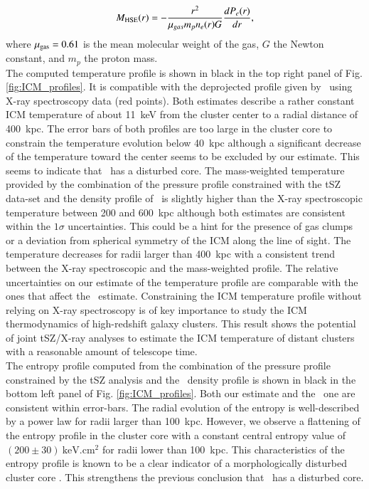 \documentclass[traditabstract]{aa}
\begin{document}
\begin{equation}
M_{\rm HSE}(r) = -\frac{r^2}{\mu_{gas} m_p n_e(r) G} \frac{dP_e(r)}{dr},
\label{eq:hse_mass}
\end{equation}
where $\mu_{\rm{gas}} = 0.61$ is the mean molecular weight of the gas, $G$ the Newton constant, and $m_p$ the proton mass.\\
\indent The computed temperature profile is shown in black in the top right panel of Fig. \ref{fig:ICM_profiles}. It is compatible with the deprojected profile given by \xmm\ using X-ray spectroscopy data (red points). Both estimates describe a rather constant ICM temperature of about 11~keV from the cluster center to a radial distance of 400~kpc. The error bars of both profiles are too large in the cluster core to constrain the temperature evolution below 40~kpc although a significant decrease of the temperature toward the center seems to be excluded by our estimate. This seems to indicate that \psz\ has a disturbed core. The mass-weighted temperature provided by the combination of the pressure profile constrained with the tSZ data-set and the density profile of \xmm\ is slightly higher than the X-ray spectroscopic temperature between 200 and 600~kpc although both estimates are consistent within the $1\sigma$ uncertainties. This could be a hint for the presence of gas clumps or a deviation from spherical symmetry of the ICM along the line of sight. The temperature decreases for radii larger than 400~kpc with a consistent trend between the X-ray spectroscopic and the mass-weighted profile. The relative uncertainties on our estimate of the temperature profile are comparable with the ones that affect the \xmm\ estimate. Constraining the ICM temperature profile without relying on X-ray spectroscopy is of key importance to study the ICM thermodynamics of high-redshift galaxy clusters. This result shows the potential of joint tSZ/X-ray analyses to estimate the ICM temperature of distant clusters with a reasonable amount of telescope time.\\
\indent The entropy profile computed from the combination of the pressure profile constrained by the tSZ analysis and the \xmm\ density profile is shown in black in the bottom left panel of Fig. \ref{fig:ICM_profiles}. Both our estimate and the \xmm\ one are consistent within error-bars. The radial evolution of the entropy is well-described by a power law for radii larger than 100~kpc. However, we observe a flattening of the entropy profile in the cluster core with a constant central entropy value of $(200 \pm 30)~\mathrm{keV.cm^2}$ for radii lower than 100~kpc. This characteristics of the entropy profile is known to be a clear indicator of a morphologically disturbed cluster core \citep[see \emph{e.g.}][]{pra10}. This strengthens the previous conclusion that \psz\ has a disturbed core.\\
\end{document}
